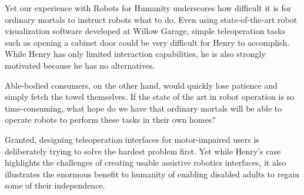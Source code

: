 \documentclass[10pt,twocolumn]{article}
\begin{document}
Yet our experience with Robots for Humanity underscores how difficult it is for ordinary mortals to instruct robots what to do. Even using state-of-the-art robot visualization software developed at Willow Garage, simple teleoperation tasks such as opening a cabinet door could be very difficult for Henry to accomplish. While Henry has only limited interaction capabilities, he is also strongly motivated because he has no alternatives. 
\begin{changebar}
Able-bodied consumers, on the other hand, would quickly lose patience and simply fetch the towel themselves. If the state of the art in robot operation is so time-consuming, what hope do we have that ordinary mortals will be able to operate robots to perform these tasks in their own homes?
\end{changebar}

Granted, designing teleoperation interfaces for motor-impaired users is deliberately trying to solve the hardest problem first.  Yet while Henry's case highlights the challenges of creating usable assistive robotics interfaces, it also illustrates the enormous benefit to humanity of enabling disabled adults to regain some of their independence.
\end{document}
